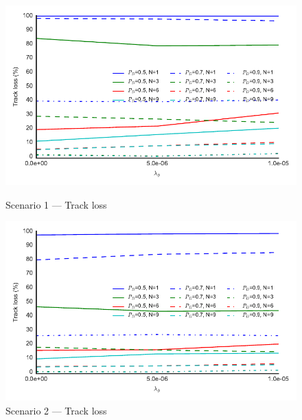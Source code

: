 \begin{figure}
\centering
\includegraphics{Figures/plots/Scenario1_Tracking-TrackLoss.pdf}
\caption{Scenario 1 --- Track loss}\label{fig:scenario1_track_loss}
\includegraphics{Figures/plots/Scenario2_Tracking-TrackLoss.pdf}
\caption{Scenario 2 --- Track loss}\label{fig:scenario2_track_loss}
\end{figure}

